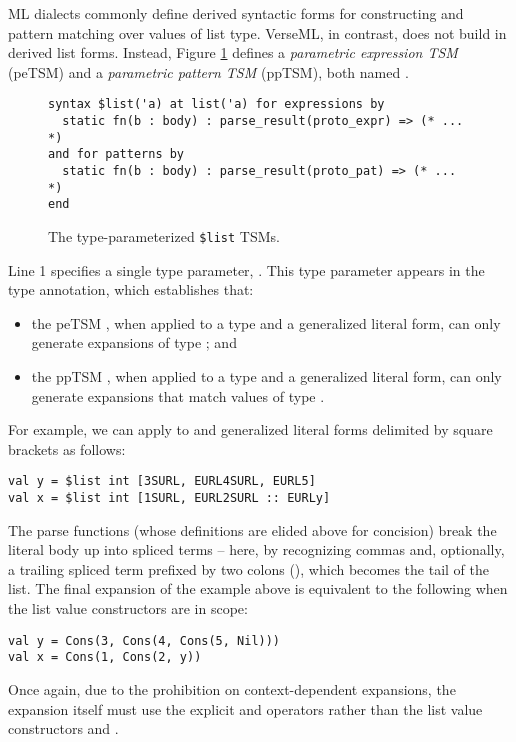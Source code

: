 ML dialects commonly define derived syntactic forms for constructing and pattern matching over values of list type. VerseML, in contrast, does not build in derived list forms. Instead, Figure \ref{fig:petsm-list} defines a \emph{parametric expression TSM} (peTSM) and a \emph{parametric pattern TSM} (ppTSM), both named .
\begin{figure}[h]
\begin{lstlisting}
syntax $list('a) at list('a) for expressions by 
  static fn(b : body) : parse_result(proto_expr) => (* ... *)
and for patterns by 
  static fn(b : body) : parse_result(proto_pat) => (* ... *) 
end
\end{lstlisting}
\caption{The type-parameterized \texttt{\$list} TSMs.}
\label{fig:petsm-list}
\end{figure}

Line 1 specifies a single type parameter, . This type parameter appears in the type annotation, which establishes that:
\begin{itemize}
\item the peTSM , when applied to a type  and a generalized literal form, can only generate expansions of type ; and 
\item the ppTSM , when applied to a type  and a generalized literal form, can only generate expansions that match values of type .
\end{itemize}
For example, we can apply  to  and generalized literal forms delimited by square brackets as follows:
\begin{lstlisting}[numbers=none]
val y = $list int [3SURL, EURL4SURL, EURL5]
val x = $list int [1SURL, EURL2SURL :: EURLy]
\end{lstlisting}
The parse functions (whose definitions are elided above for concision) break the literal body up into  spliced terms -- here, by recognizing commas and, optionally, a trailing spliced term prefixed by two colons (), which becomes the tail of the list. The final expansion of the example above is equivalent to the following when the list value constructors are in scope:
\begin{lstlisting}[numbers=none]
val y = Cons(3, Cons(4, Cons(5, Nil)))
val x = Cons(1, Cons(2, y))
\end{lstlisting}
Once again, due to the prohibition on context-dependent expansions, the expansion itself must use the explicit  and  operators rather than the list value constructors  and .

